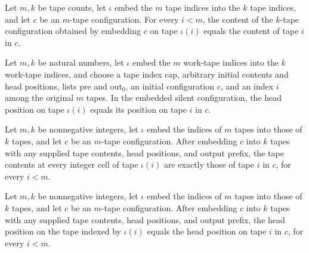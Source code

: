 \begin{theorem}
\label{Turing.embedSilentCfg_selected_tape}
\leanok
{}
Let $m,k$ be tape counts, let $\iota$ embed the $m$ tape indices into the $k$ tape
indices, and let $c$ be an $m$-tape configuration. For every $i<m$, the content of the
$k$-tape configuration obtained by embedding $c$ on tape $\iota(i)$ equals the content
of tape $i$ in $c$.
\end{theorem}

\begin{theorem}
\label{Turing.embedSilentCfg_selected_pos}
\leanok
{}
Let $m,k$ be natural numbers, let $\iota$ embed the $m$ work-tape indices into the $k$
work-tape indices, and choose a tape index $\mathrm{cap}$, arbitrary initial contents
and head positions, lists $\mathrm{pre}$ and $\mathrm{out}_0$, an initial configuration
$c$, and an index $i$ among the original $m$ tapes. In the embedded silent
configuration, the head position on tape $\iota(i)$ equals its position on tape $i$ in
$c$.
\end{theorem}

\begin{theorem}
\label{Turing.embedEmitCfg_selected_tape}
\leanok
{}
Let $m,k$ be nonnegative integers, let $\iota$ embed the indices of $m$ tapes into those
of $k$ tapes, and let $c$ be an $m$-tape configuration. After embedding $c$ into $k$
tapes with any supplied tape contents, head positions, and output prefix, the tape
contents at every integer cell of tape $\iota(i)$ are exactly those of tape $i$ in $c$,
for every $i<m$.
\end{theorem}

\begin{theorem}
\label{Turing.embedEmitCfg_selected_pos}
\leanok
{}
Let $m,k$ be nonnegative integers, let $\iota$ embed the indices of $m$ tapes into those
of $k$ tapes, and let $c$ be an $m$-tape configuration. After embedding $c$ into $k$
tapes with any supplied tape contents, head positions, and output prefix, the head
position on the tape indexed by $\iota(i)$ equals the head position on tape $i$ in $c$,
for every $i<m$.
\end{theorem}

